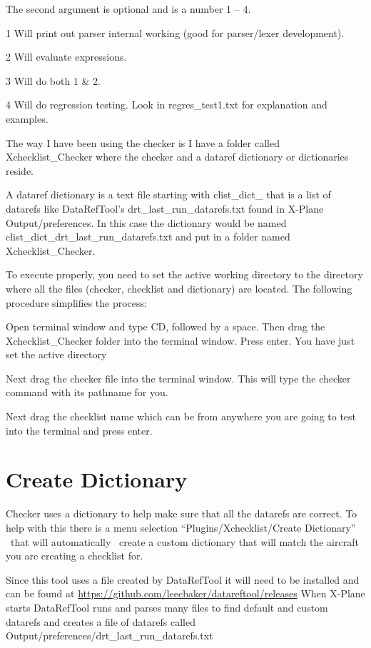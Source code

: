 \documentclass[11pt,parskip=half,a4paper]{scrartcl}
\begin{document}
The second argument is optional and is a number 1 -- 4.

1 Will print out parser internal working (good for parser/lexer development).

2 Will evaluate expressions.

3 Will do both 1 \& 2.

4 Will do regression testing. Look in regres\_test1.txt for explanation and examples.

The way I have been using the checker is I have a folder called Xchecklist\_Checker where the checker and a dataref dictionary or dictionaries reside.

A dataref dictionary is a text file starting with clist\_dict\_ that is a list of datarefs like DataRefTool's
drt\_last\_run\_datarefs.txt found in X-Plane Output/preferences. In this case the dictionary would be named
clist\_dict\_drt\_last\_run\_datarefs.txt and put in a folder named Xchecklist\_Checker.

To execute properly, you need to set the active working directory to the directory where all the files (checker,
checklist and dictionary) are located. The following procedure simplifies the process:

Open terminal window and type CD, followed by a space. Then drag the Xchecklist\_Checker folder into the terminal window. Press enter. You have just set the active directory

Next drag the checker file into the terminal window. This will type the checker command with its pathname for you.

Next drag the checklist name which can be from anywhere you are going to test into the terminal and press enter.

\newpage
\section{Create Dictionary}


Checker uses a dictionary to help make sure that all the datarefs are correct. To help with this there is a menu
selection ``Plugins/Xchecklist/Create Dictionary'' \ that will automatically \ create a custom dictionary that will match the aircraft you are creating a checklist for.

Since this tool uses a file created by DataRefTool it will need to be installed and can be found at
\url{https://github.com/leecbaker/datareftool/releases} When X-Plane starts DataRefTool runs and parses many files to find default and custom datarefs and creates a file of datarefs called
Output/preferences/drt\_last\_run\_datarefs.txt
\end{document}
